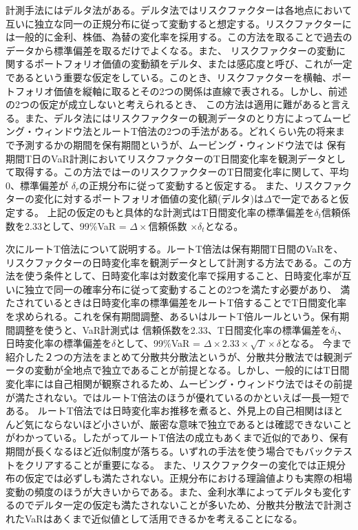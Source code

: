 \documentclass[12pt]{jsarticle}
\begin{document}
計測手法にはデルタ法がある。デルタ法ではリスクファクターは各地点において互いに独立な同一の正規分布に従って変動すると想定する。リスクファクターには一般的に金利、株価、為替の変化率を採用する。この方法を取ることで過去のデータから標準偏差を取るだけでよくなる。また、
リスクファクターの変動に関するポートフォリオ価値の変動額をデルタ、または感応度と呼び、これが一定であるという重要な仮定をしている。このとき、リスクファクターを横軸、ポートフォリオ価値を縦軸に取るとその2つの関係は直線で表される。しかし、前述の2つの仮定が成立しないと考えられるとき、
この方法は適用に難があると言える。また、デルタ法にはリスクファクターの観測データのとり方によってムービング・ウィンドウ法とルートT倍法の2つの手法がある。どれくらい先の将来まで予測するかの期間を保有期間というが、ムービング・ウィンドウ法では
保有期間T日のVaR計測においてリスクファクターのT日間変化率を観測データとして取得する。この方法ではーのリスクファクターのT日間変化率に関して、平均0、標準偏差が $\delta _r$の正規分布に従って変動すると仮定する。
また、リスクファクターの変化に対するポートフォリオ価値の変化額(デルタ)は$\Delta$で一定であると仮定する。
上記の仮定のもと具体的な計測式はT日間変化率の標準偏差を${\delta}_t$信頼係数を2.33として、99\%VaR = $\Delta \times$信頼係数 $\times {\delta}_t$となる。\par
次にルートT倍法について説明する。ルートT倍法は保有期間T日間のVaRを、リスクファクターの日時変化率を観測データとして計測する方法である。この方法を使う条件として、日時変化率は対数変化率で採用すること、日時変化率が互いに独立で同一の確率分布に従って変動することの2つを満たす必要があり、
満たされているときは日時変化率の標準偏差をルートT倍することでT日間変化率を求められる。これを保有期間調整、あるいはルートT倍ルールという。保有期間調整を使うと、VaR計測式は
信頼係数を2.33、T日間変化率の標準偏差を${\delta}_t$、日時変化率の標準偏差を${\delta}$として、99\%VaR = $\Delta \times 2.33 \times \sqrt{T} \times \delta$となる。
今まで紹介した２つの方法をまとめて分散共分散法というが、分散共分散法では観測データの変動が全地点で独立であることが前提となる。しかし、一般的にはT日間変化率には自己相関が観察されるため、ムービング・ウィンドウ法ではその前提が満たされない。ではルートT倍法のほうが優れているのかといえば一長一短である。
ルートT倍法では日時変化率お推移を煮ると、外見上の自己相関はほとんど気にならないほど小さいが、厳密な意味で独立であるとは確認できないことがわかっている。したがってルートT倍法の成立もあくまで近似的であり、保有期間が長くなるほど近似制度が落ちる。いずれの手法を使う場合でもバックテストをクリアすることが重要になる。
また、リスクファクターの変化では正規分布の仮定では必ずしも満たされない。正規分布における理論値よりも実際の相場変動の頻度のほうが大きいからである。また、金利水準によってデルタも変化するのでデルタ一定の仮定も満たされないことが多いため、分散共分散法で計測されたVaRはあくまで近似値として活用できるかを考えることになる。
\end{document}
